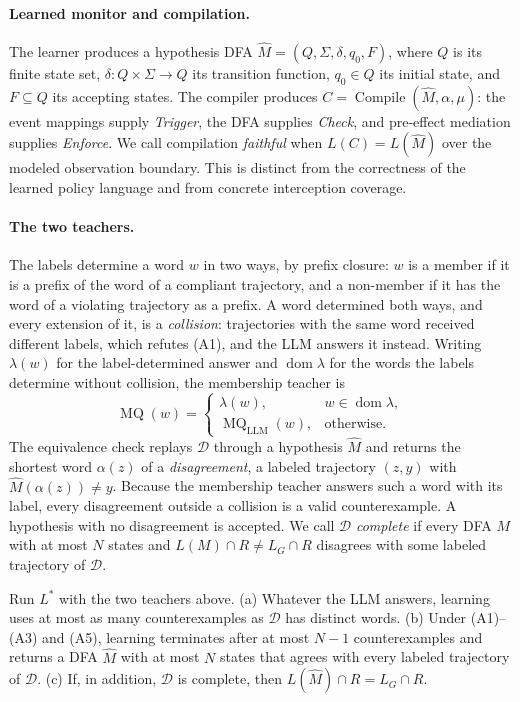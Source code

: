 \paragraph{Learned monitor and compilation.}
The learner produces a hypothesis DFA $\widehat M=(Q,\Sigma,\delta,q_0,F)$, where $Q$ is its finite state set, $\delta:Q\times\Sigma\rightarrow Q$ its transition function, $q_0\in Q$ its initial state, and $F\subseteq Q$ its accepting states. The compiler produces $C=\operatorname{Compile}(\widehat M,\alpha,\mu)$: the event mappings supply \emph{Trigger}, the DFA supplies \emph{Check}, and pre-effect mediation supplies \emph{Enforce}. We call compilation \emph{faithful} when $L(C)=L(\widehat M)$ over the modeled observation boundary. This is distinct from the correctness of the learned policy language and from concrete interception coverage.

\paragraph{The two teachers.}
The labels determine a word $w$ in two ways, by prefix closure: $w$ is a member if it is a prefix of the word of a compliant trajectory, and a non-member if it has the word of a violating trajectory as a prefix. A word determined both ways, and every extension of it, is a \emph{collision}: trajectories with the same word received different labels, which refutes (A1), and the LLM answers it instead. Writing $\lambda(w)$ for the label-determined answer and $\operatorname{dom}\lambda$ for the words the labels determine without collision, the membership teacher is
\[
  \operatorname{MQ}(w)=
  \begin{cases}
    \lambda(w), & w\in\operatorname{dom}\lambda,\\
    \operatorname{MQ}_{\mathrm{LLM}}(w), & \text{otherwise}.
  \end{cases}
\]
The equivalence check replays $\mathcal{D}$ through a hypothesis $\widehat M$ and returns the shortest word $\alpha(z)$ of a \emph{disagreement}, a labeled trajectory $(z,y)$ with $\widehat M(\alpha(z))\neq y$. Because the membership teacher answers such a word with its label, every disagreement outside a collision is a valid counterexample. A hypothesis with no disagreement is accepted. We call $\mathcal{D}$ \emph{complete} if every DFA $M$ with at most $N$ states and $L(M)\cap R\neq L_G\cap R$ disagrees with some labeled trajectory of $\mathcal{D}$.

\begin{theorem}\label{thm:exact}
Run $L^*$ with the two teachers above.
(a) Whatever the LLM answers, learning uses at most as many counterexamples as $\mathcal{D}$ has distinct words.
(b) Under (A1)--(A3) and (A5), learning terminates after at most $N-1$ counterexamples and returns a DFA $\widehat M$ with at most $N$ states that agrees with every labeled trajectory of $\mathcal{D}$.
(c) If, in addition, $\mathcal{D}$ is complete, then $L(\widehat M)\cap R=L_G\cap R$.
\end{theorem}

